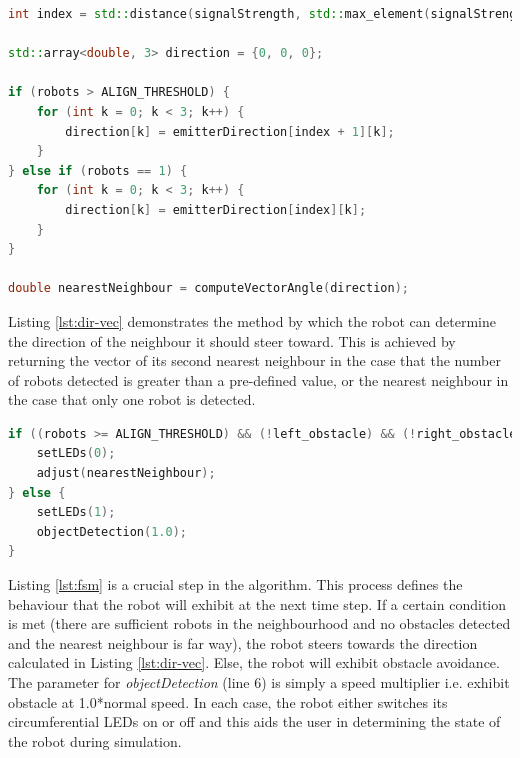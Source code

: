 \clearpage
\begin{lstlisting}[language=C++, caption={Calculating target vector},label={lst:dir-vec}]
int index = std::distance(signalStrength, std::max_element(signalStrength, signalStrength + sizeof(signalStrength) / sizeof(double)));

std::array<double, 3> direction = {0, 0, 0};

if (robots > ALIGN_THRESHOLD) {
	for (int k = 0; k < 3; k++) {
		direction[k] = emitterDirection[index + 1][k];
	}
} else if (robots == 1) {
	for (int k = 0; k < 3; k++) {
		direction[k] = emitterDirection[index][k];
	}
}

double nearestNeighbour = computeVectorAngle(direction);
\end{lstlisting}

Listing \ref{lst:dir-vec} demonstrates the method by which the robot can determine the direction of the neighbour it should steer toward. This is achieved by returning the vector of its second nearest neighbour in the case that the number of robots detected is greater than a pre-defined value, or the nearest neighbour in the case that only one robot is detected.
\clearpage

\begin{lstlisting}[language=C++, caption={Action for next step},label={lst:fsm}]
if ((robots >= ALIGN_THRESHOLD) && (!left_obstacle) && (!right_obstacle) && signalStrength[index] < 10) {
	setLEDs(0);
	adjust(nearestNeighbour);
} else {
	setLEDs(1);
	objectDetection(1.0);
}
\end{lstlisting}

Listing \ref{lst:fsm} is a crucial step in the algorithm. This process defines the behaviour that the robot will exhibit at the next time step. If a certain condition is met (there are sufficient robots in the neighbourhood and no obstacles detected and the nearest neighbour is far way), the robot steers towards the direction calculated in Listing \ref{lst:dir-vec}. Else, the robot will exhibit obstacle avoidance. The parameter for \textit{objectDetection} (line 6) is simply a speed multiplier i.e. exhibit obstacle at 1.0*normal speed. In each case, the robot either switches its circumferential LEDs on or off and this aids the user in determining the state of the robot during simulation.

